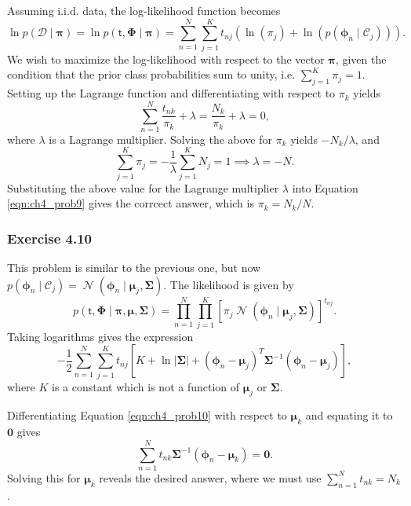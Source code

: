 \documentclass[12pt, a4paper]{article}
\newcommand{\D}{\mathcal{D}}
\newcommand{\vect}[1]{\bm{#1}}
\newcommand{\abs}[1]{\left\lvert#1\right\rvert}
\DeclareMathOperator{\N}{\mathcal{N}}
\begin{document}
Assuming i.i.d. data, the log-likelihood function becomes
\begin{equation*}
	\ln 
	p( \D \mid \vect{\pi})
	=
	\ln 
	p( \mathsf{t}, \vect{\Phi} \mid \vect{\pi})
	=
	\sum_{n=1}^{N}
	\sum_{j=1}^{K}
	t_{nj} \left( 
	\ln \left( \pi_j \right)
	+
	\ln \left( p(\vect{\phi}_n \mid  \mathcal{C}_j) \right) \right).
\end{equation*}
We wish to maximize the log-likelihood with respect to the vector $\vect{\pi}$, given the condition that the prior class probabilities sum to unity, i.e. $\sum_{j=1}^{K} \pi_j = 1$.
Setting up the Lagrange function and differentiating with respect to $\pi_k$ yields
\begin{equation}
\label{eqn:ch4_prob9}
	\sum_{n=1}^{N} \frac{t_{nk}}{\pi_k} + \lambda =
	\frac{N_k}{\pi_k} + \lambda =
	 0,
\end{equation}
where $\lambda$ is a Lagrange multiplier.
Solving the above for $\pi_k$ yields $- N_k / \lambda$, and
\begin{equation*}
	\sum_{j=1}^{K} \pi_j = - \frac{1}{\lambda}  \sum_{j=1}^{K} N_j = 1
	\implies \lambda = -N.
\end{equation*}
Substituting the above value for the Lagrange multiplier $\lambda$ into Equation \eqref{eqn:ch4_prob9} gives the corrcect answer, which is $\pi_k = N_k /N$.


\subsubsection*{Exercise 4.10}
This problem is similar to the previous one, but now $ p(\vect{\phi}_n \mid  \mathcal{C}_j) = \N \left( \vect{\phi}_n \mid \vect{\mu}_j, \vect{\Sigma} \right)$.
The likelihood is given by
\begin{equation*}
	p( \mathsf{t}, \vect{\Phi} \mid \vect{\pi}, \vect{\mu}, \vect{\Sigma})
	=
	\prod_{n=1}^{N}
	\prod_{j=1}^{K}
	\left[ \pi_j \N \left( \vect{\phi}_n \mid \vect{\mu}_j, \vect{\Sigma} \right) \right]^{t_{nj}}.
\end{equation*}
Taking logarithms gives the expression
\begin{equation}
\label{eqn:ch4_prob10}
	- \frac{1}{2}\sum_{n=1}^{N}
	\sum_{j=1}^{K}
	t_{nj} 
	\left[  
	K + 
	\ln \abs{\vect{\Sigma}}
	+
	(\vect{\phi}_n - \vect{\mu}_j)^T 
	\vect{\Sigma}^{-1} 
	(\vect{\phi}_n - \vect{\mu}_j)
	\right],
\end{equation}
where $K$ is a constant which is not a function of $\vect{\mu}_j$ or $\vect{\Sigma}$.

Differentiating Equation \eqref{eqn:ch4_prob10} with respect to $\vect{\mu}_k$
and equating it to $\vect{0}$ gives
\begin{equation*}
\sum_{n=1}^{N}
t_{nk} 
\vect{\Sigma}^{-1} 
(\vect{\phi}_n - \vect{\mu}_k)
=
\vect{0}.
\end{equation*}
Solving this for $\vect{\mu}_k$ reveals the desired answer, where we must use $\sum_{n=1}^{N}
t_{nk} = N_k$.
\end{document}

